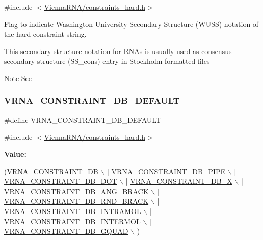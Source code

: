 {\ttfamily \#include $<$\hyperlink{constraints__hard_8h}{Vienna\+R\+N\+A/constraints\+\_\+hard.\+h}$>$}



Flag to indicate Washington University Secondary Structure (W\+U\+SS) notation of the hard constraint string. 

This secondary structure notation for R\+N\+As is usually used as consensus secondary structure (S\+S\+\_\+cons) entry in Stockholm formatted files

\begin{DoxyNote}{Note}
See 
\end{DoxyNote}
\mbox{\label{group__hard__constraints_ga1c3864bdc92147a4d93de2b1b4356177}} 
\subsubsection{\texorpdfstring{V\+R\+N\+A\+\_\+\+C\+O\+N\+S\+T\+R\+A\+I\+N\+T\+\_\+\+D\+B\+\_\+\+D\+E\+F\+A\+U\+LT}{VRNA\_CONSTRAINT\_DB\_DEFAULT}}
{\footnotesize\ttfamily \#define V\+R\+N\+A\+\_\+\+C\+O\+N\+S\+T\+R\+A\+I\+N\+T\+\_\+\+D\+B\+\_\+\+D\+E\+F\+A\+U\+LT}



{\ttfamily \#include $<$\hyperlink{constraints__hard_8h}{Vienna\+R\+N\+A/constraints\+\_\+hard.\+h}$>$}

{\bfseries Value\+:}
\begin{DoxyCode}
(\hyperlink{group__hard__constraints_ga4bfc2f15c4f261c62a11af9d2aa80c90}{VRNA\_CONSTRAINT\_DB} \(\backslash\)
   | \hyperlink{group__hard__constraints_ga13053547a2de5532b64b64d35e097ae1}{VRNA\_CONSTRAINT\_DB\_PIPE} \(\backslash\)
   | \hyperlink{group__hard__constraints_ga369bea82eae75fbe626f409fa425747e}{VRNA\_CONSTRAINT\_DB\_DOT} \(\backslash\)
   | \hyperlink{group__hard__constraints_ga7283bbe0f8954f7b030ecc3f2d1932b2}{VRNA\_CONSTRAINT\_DB\_X} \(\backslash\)
   | \hyperlink{constraints__hard_8h_ad54c1315a47d55653dcaa5de6e544b77}{VRNA\_CONSTRAINT\_DB\_ANG\_BRACK} \(\backslash\)
   | \hyperlink{group__hard__constraints_gac17b034852c914bc5879954c65d7e74b}{VRNA\_CONSTRAINT\_DB\_RND\_BRACK} \(\backslash\)
   | \hyperlink{group__hard__constraints_ga5c17253f5a39d1d49b0fb11f5196982a}{VRNA\_CONSTRAINT\_DB\_INTRAMOL} \(\backslash\)
   | \hyperlink{group__hard__constraints_ga31d0ebb9755ca8a4acafc14f00ca755d}{VRNA\_CONSTRAINT\_DB\_INTERMOL} \(\backslash\)
   | \hyperlink{group__hard__constraints_ga75cfab03cdc97c95b3ce8bb29f52b08e}{VRNA\_CONSTRAINT\_DB\_GQUAD} \(\backslash\)
  )
\end{DoxyCode}


